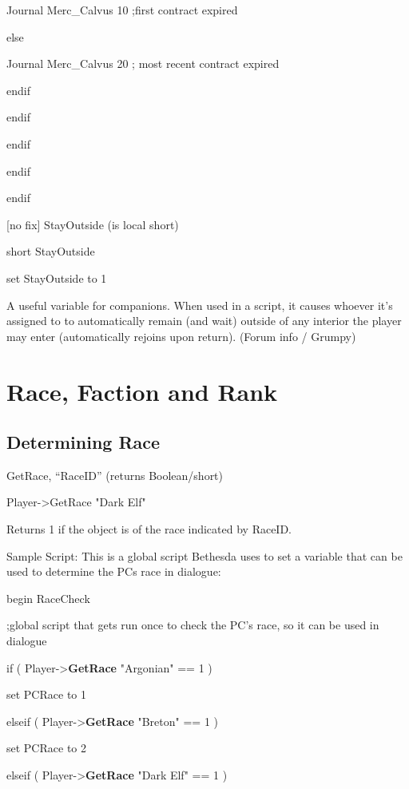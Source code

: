 \documentclass[
]{article}
\begin{document}
Journal Merc\_Calvus 10 ;first contract expired

else

Journal Merc\_Calvus 20 ; most recent contract expired

endif

endif

endif

endif

endif

{[}no fix{]} StayOutside (is local short)

short StayOutside

set StayOutside to 1

A useful variable for companions. When used in a script, it causes
whoever it's assigned to to automatically remain (and wait) outside of
any interior the player may enter (automatically rejoins upon return).
(Forum info / Grumpy)

\hypertarget{race-faction-and-rank}{%
\section{\texorpdfstring{\hfill\break
Race, Faction and
Rank}{ Race, Faction and Rank}}\label{race-faction-and-rank}}

\hypertarget{determining-race}{%
\subsection{Determining Race}\label{determining-race}}

GetRace, ``RaceID'' (returns Boolean/short)

Player-\textgreater GetRace "Dark Elf"

Returns 1 if the object is of the race indicated by RaceID.

Sample Script: This is a global script Bethesda uses to set a variable
that can be used to determine the PCs race in dialogue:

begin RaceCheck

;global script that gets run once to check the PC's race, so it can be
used in dialogue

if ( Player-\textgreater{}\textbf{GetRace} "Argonian" == 1 )

set PCRace to 1

elseif ( Player-\textgreater{}\textbf{GetRace} "Breton" == 1 )

set PCRace to 2

elseif ( Player-\textgreater{}\textbf{GetRace} "Dark Elf" == 1 )
\end{document}
